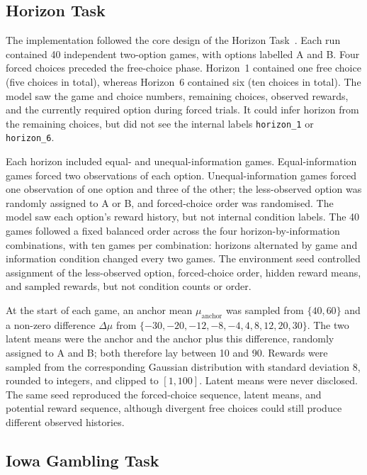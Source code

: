 \documentclass[logo,msc]{infthesis}
\begin{document}
\subsection{Horizon Task}

The implementation followed the core design of the Horizon Task~\cite{Wilson2014}. Each run contained 40 independent two-option games, with options labelled A and B. Four forced choices preceded the free-choice phase. Horizon~1 contained one free choice (five choices in total), whereas Horizon~6 contained six (ten choices in total). The model saw the game and choice numbers, remaining choices, observed rewards, and the currently required option during forced trials. It could infer horizon from the remaining choices, but did not see the internal labels \texttt{horizon\_1} or \texttt{horizon\_6}.

Each horizon included equal- and unequal-information games. Equal-information games forced two observations of each option. Unequal-information games forced one observation of one option and three of the other; the less-observed option was randomly assigned to A or B, and forced-choice order was randomised. The model saw each option's reward history, but not internal condition labels. The 40 games followed a fixed balanced order across the four horizon-by-information combinations, with ten games per combination: horizons alternated by game and information condition changed every two games. The environment seed controlled assignment of the less-observed option, forced-choice order, hidden reward means, and sampled rewards, but not condition counts or order.

At the start of each game, an anchor mean $\mu_{\mathrm{anchor}}$ was sampled from $\{40,60\}$ and a non-zero difference $\Delta\mu$ from $\{-30,-20,-12,-8,-4,4,8,12,20,30\}$. The two latent means were the anchor and the anchor plus this difference, randomly assigned to A and B; both therefore lay between 10 and 90. Rewards were sampled from the corresponding Gaussian distribution with standard deviation 8, rounded to integers, and clipped to $[1,100]$. Latent means were never disclosed. The same seed reproduced the forced-choice sequence, latent means, and potential reward sequence, although divergent free choices could still produce different observed histories.

\subsection{Iowa Gambling Task}
\end{document}
